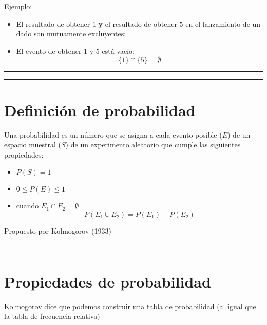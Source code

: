 \documentclass[
]{book}
\providecommand{\tightlist}{%
  \setlength{\itemsep}{0pt}\setlength{\parskip}{0pt}}
\begin{document}
Ejemplo:

\begin{itemize}
\item
  El resultado de obtener \(1\) \textbf{y} el resultado de obtener \(5\) en el lanzamiento de un dado son mutuamente excluyentes:
\item
  El evento de obtener \(1\) y \(5\) está vacío:\[\{1\}\cap \{5\}=\emptyset\]
\end{itemize}

\begin{center}\rule{0.5\linewidth}{0.5pt}\end{center}

\begin{center}\rule{0.5\linewidth}{0.5pt}\end{center}

\hypertarget{definiciuxf3n-de-probabilidad}{%
\section{Definición de probabilidad}\label{definiciuxf3n-de-probabilidad}}

Una probabilidad es un número que se asigna a cada evento posible (\(E\)) de un espacio muestral (\(S\)) de un experimento aleatorio que cumple las siguientes propiedades:

\begin{itemize}
\tightlist
\item
  \(P(S)=1\)
\item
  \(0 \leq P(E) \leq 1\)
\item
  cuando \(E_1\cap E_2=\emptyset\) \[P(E_1\cup E_2) = P(E_1) + P(E_2)\]
\end{itemize}

Propuesto por Kolmogorov (1933)

\begin{center}\rule{0.5\linewidth}{0.5pt}\end{center}

\begin{center}\rule{0.5\linewidth}{0.5pt}\end{center}

\hypertarget{propiedades-de-probabilidad}{%
\section{Propiedades de probabilidad}\label{propiedades-de-probabilidad}}

Kolmogorov dice que podemos construir una tabla de probabilidad (al igual que la tabla de frecuencia relativa)
\end{document}
